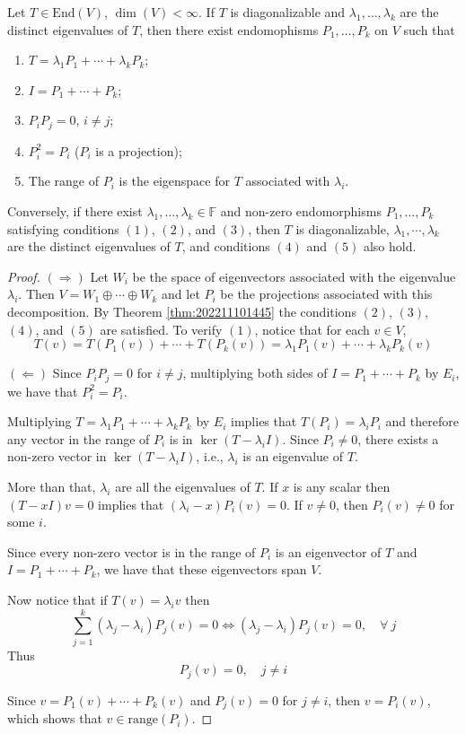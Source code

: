 \begin{theorem}
	Let $T \in \text{End}(V)$, $\dim(V) < \infty$. If $T$ is diagonalizable and $\lambda_1, \ldots, \lambda_k$ are the distinct eigenvalues of $T$, then there exist endomophisms $P_1, \ldots, P_k$ on $V$ such that
	\begin{enumerate}
		\item $T = \lambda_1 P_1 + \cdots + \lambda_k P_k$;
		\item $I = P_1 + \cdots + P_k$;
		\item $P_i P_j = 0$, $i \neq j$;
		\item $P_i^2 = P_i$ ($P_i$ is a projection);
		\item The range of $P_i$ is the eigenspace for $T$ associated with $\lambda_i$.
	\end{enumerate}

	Conversely, if there exist $\lambda_1, \ldots, \lambda_k \in \mathbb{F}$ and non-zero endomorphisms $P_1, \ldots, P_k$ satisfying conditions $(1)$, $(2)$, and $(3)$, then $T$ is diagonalizable, $\lambda_1, \cdots, \lambda_k$ are the distinct eigenvalues of $T$, and conditions $(4)$ and $(5)$ also hold.
\end{theorem}

\begin{proof}
	$(\Rightarrow)$ Let $W_i$ be the space of eigenvectors associated with the eigenvalue $\lambda_i$. Then $V = W_1 \oplus \cdots \oplus W_k$ and let $P_i$ be the projections associated with this decomposition. By Theorem \ref{thm:202211101445} the conditions $(2)$, $(3)$, $(4)$, and $(5)$ are satisfied. To verify $(1)$, notice that for each $v \in V$,
	\[
		T(v) = T(P_1(v)) + \cdots + T(P_k(v)) = \lambda_1 P_1(v) + \cdots + \lambda_k P_k(v)
	\]

	$(\Leftarrow)$ Since $P_i P_j = 0$ for $i \neq j$, multiplying both sides of $I = P_1 + \cdots + P_k$ by $E_i$, we have that $P_i^2 = P_i$. 

	Multiplying $T = \lambda_1 P_1 + \cdots + \lambda_k P_k$ by $E_i$ implies that $T(P_i) = \lambda_i P_i$ and therefore any vector in the range of $P_i$ is in $\ker (T - \lambda_i I)$. Since $P_i \neq 0$, there exists a non-zero vector in $\ker (T - \lambda_i I)$, i.e., $\lambda_i$ is an eigenvalue of $T$.
	
	More than that, $\lambda_i$ are all the eigenvalues of $T$. If $x$ is any scalar then $(T - xI)v = 0$ implies that $(\lambda_i - x)P_i(v) = 0$. If $v \neq 0$, then $P_i(v) \neq 0$ for some $i$. 
	
	Since every non-zero vector is in the range of $P_i$ is an eigenvector of $T$ and $I = P_1 + \cdots + P_k$, we have that these eigenvectors span $V$. 

	Now notice that if $T(v) = \lambda_i v$ then 
	\[
		\sum_{j=1}^k (\lambda_j - \lambda_i) P_j(v) = 0 \iff (\lambda_j - \lambda_i) P_j(v) = 0, \quad \forall~j
	\]
	Thus
	\[
		P_j(v) = 0, \quad j \neq i
	\]

	Since $v = P_1(v) + \cdots + P_k(v)$ and $P_j(v) = 0$ for $j \neq i$, then $v = P_i(v)$, which shows that $v \in \text{range}(P_i)$.
\end{proof}

